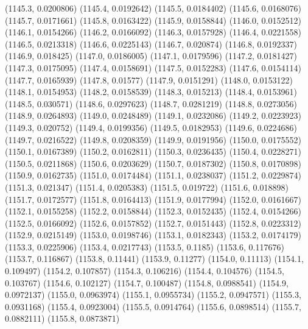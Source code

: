 {					(1145.3, 0.0200806)
					(1145.4, 0.0192642)
					(1145.5, 0.0184402)
					(1145.6, 0.0168076)
					(1145.7, 0.0171661)
					(1145.8, 0.0163422)
					(1145.9, 0.0158844)
					(1146.0, 0.0152512)
					(1146.1, 0.0154266)
					(1146.2, 0.0166092)
					(1146.3, 0.0157928)
					(1146.4, 0.0221558)
					(1146.5, 0.0213318)
					(1146.6, 0.0225143)
					(1146.7, 0.020874)
					(1146.8, 0.0192337)
					(1146.9, 0.018425)
					(1147.0, 0.0186005)
					(1147.1, 0.0179596)
					(1147.2, 0.0181427)
					(1147.3, 0.0175095)
					(1147.4, 0.0158691)
					(1147.5, 0.0152283)
					(1147.6, 0.0154114)
					(1147.7, 0.0165939)
					(1147.8, 0.01577)
					(1147.9, 0.0151291)
					(1148.0, 0.0153122)
					(1148.1, 0.0154953)
					(1148.2, 0.0158539)
					(1148.3, 0.015213)
					(1148.4, 0.0153961)
					(1148.5, 0.030571)
					(1148.6, 0.0297623)
					(1148.7, 0.0281219)
					(1148.8, 0.0273056)
					(1148.9, 0.0264893)
					(1149.0, 0.0248489)
					(1149.1, 0.0232086)
					(1149.2, 0.0223923)
					(1149.3, 0.020752)
					(1149.4, 0.0199356)
					(1149.5, 0.0182953)
					(1149.6, 0.0224686)
					(1149.7, 0.0216522)
					(1149.8, 0.0208359)
					(1149.9, 0.0191956)
					(1150.0, 0.0175552)
					(1150.1, 0.0167389)
					(1150.2, 0.0162811)
					(1150.3, 0.0236435)
					(1150.4, 0.0228271)
					(1150.5, 0.0211868)
					(1150.6, 0.0203629)
					(1150.7, 0.0187302)
					(1150.8, 0.0170898)
					(1150.9, 0.0162735)
					(1151.0, 0.0174484)
					(1151.1, 0.0238037)
					(1151.2, 0.0229874)
					(1151.3, 0.021347)
					(1151.4, 0.0205383)
					(1151.5, 0.019722)
					(1151.6, 0.018898)
					(1151.7, 0.0172577)
					(1151.8, 0.0164413)
					(1151.9, 0.0177994)
					(1152.0, 0.0161667)
					(1152.1, 0.0155258)
					(1152.2, 0.0158844)
					(1152.3, 0.0152435)
					(1152.4, 0.0154266)
					(1152.5, 0.0166092)
					(1152.6, 0.0157852)
					(1152.7, 0.0151443)
					(1152.8, 0.0223312)
					(1152.9, 0.0215149)
					(1153.0, 0.0198746)
					(1153.1, 0.0182343)
					(1153.2, 0.0174179)
					(1153.3, 0.0225906)
					(1153.4, 0.0217743)
					(1153.5, 0.1185)
					(1153.6, 0.117676)
					(1153.7, 0.116867)
					(1153.8, 0.11441)
					(1153.9, 0.11277)
					(1154.0, 0.11113)
					(1154.1, 0.109497)
					(1154.2, 0.107857)
					(1154.3, 0.106216)
					(1154.4, 0.104576)
					(1154.5, 0.103767)
					(1154.6, 0.102127)
					(1154.7, 0.100487)
					(1154.8, 0.0988541)
					(1154.9, 0.0972137)
					(1155.0, 0.0963974)
					(1155.1, 0.0955734)
					(1155.2, 0.0947571)
					(1155.3, 0.0931168)
					(1155.4, 0.0923004)
					(1155.5, 0.0914764)
					(1155.6, 0.0898514)
					(1155.7, 0.0882111)
					(1155.8, 0.0873871)
}
